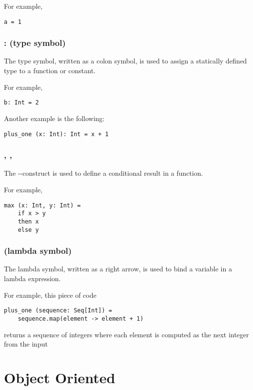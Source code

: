\documentclass[12pt,a4paper]{book}
\begin{document}
    For example,
    \begin{lstlisting}[label={lst:exampleDef}]
  a = 1
    \end{lstlisting}

    \subsubsection{: (type symbol)}

    The type symbol, written as a colon symbol, is used to assign a statically defined type to a function or constant.

    For example,
    \begin{lstlisting}[label={lst:exampleType01}]
  b: Int = 2
    \end{lstlisting}

    Another example is the following:
    \begin{lstlisting}[label={lst:exampleType02}]
  plus_one (x: Int): Int = x + 1
    \end{lstlisting}

    \subsubsection{\sif, \sthen, \selse}

    The \sif-\sthen-\selse construct is used to define a conditional result in a function.

    For example,
    \begin{lstlisting}[label={lst:exampleIfThenElse}]
  max (x: Int, y: Int) =
    if x > y
    then x
    else y
    \end{lstlisting}

    \subsubsection{\slambda (lambda symbol)}

    The lambda symbol, written as a right arrow, is used to bind a variable in a lambda expression.

    For example, this piece of code
    \begin{lstlisting}[label={lst:exampleLambda}]
  plus_one (sequence: Seq[Int]) =
    sequence.map(element -> element + 1)
    \end{lstlisting}
    returns a sequence of integers where each element is computed as the next integer from the input


    \section{Object Oriented}
\end{document}
